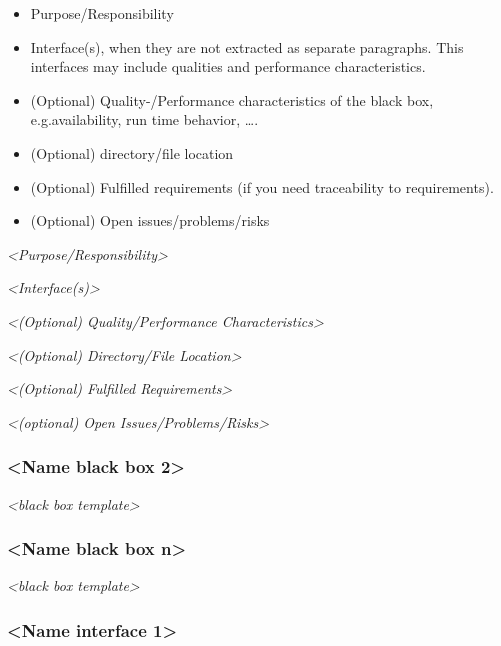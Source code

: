 \begin{itemize}
\item
  Purpose/Responsibility
\item
  Interface(s), when they are not extracted as separate paragraphs. This
  interfaces may include qualities and performance characteristics.
\item
  (Optional) Quality-/Performance characteristics of the black box,
  e.g.availability, run time behavior, \ldots.
\item
  (Optional) directory/file location
\item
  (Optional) Fulfilled requirements (if you need traceability to
  requirements).
\item
  (Optional) Open issues/problems/risks
\end{itemize}

\emph{\textless Purpose/Responsibility\textgreater{}}

\emph{\textless Interface(s)\textgreater{}}

\emph{\textless(Optional) Quality/Performance
Characteristics\textgreater{}}

\emph{\textless(Optional) Directory/File Location\textgreater{}}

\emph{\textless(Optional) Fulfilled Requirements\textgreater{}}

\emph{\textless(optional) Open Issues/Problems/Risks\textgreater{}}

\hypertarget{__name_black_box_2}{%
\subsubsection{\textless Name black box
2\textgreater{}}\label{__name_black_box_2}}

\emph{\textless black box template\textgreater{}}

\hypertarget{__name_black_box_n}{%
\subsubsection{\textless Name black box
n\textgreater{}}\label{__name_black_box_n}}

\emph{\textless black box template\textgreater{}}

\hypertarget{__name_interface_1}{%
\subsubsection{\textless Name interface
1\textgreater{}}\label{__name_interface_1}}

